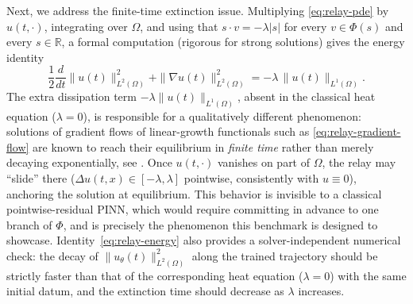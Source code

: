 \documentclass[11pt]{elsarticle}
\theoremstyle{definition}
\theoremstyle{remark}
\numberwithin{equation}{section}
\begin{document}
Next, we address the finite-time extinction issue. Multiplying \eqref{eq:relay-pde} by $u(t,\cdot)$, integrating over $\Omega$,
and using that $s\cdot v = -\lambda|s|$ for every $v\in\Phi(s)$ and every
$s\in\mathbb{R}$, a formal computation (rigorous for strong solutions) gives
the energy identity
\begin{equation}
	\label{eq:relay-energy}
	\frac12\frac{d}{dt}\|u(t)\|_{L^2(\Omega)}^2
	+
	\|\nabla u(t)\|_{L^2(\Omega)}^2
	=
	-\lambda\,\|u(t)\|_{L^1(\Omega)}.
\end{equation}
The extra dissipation term $-\lambda\|u(t)\|_{L^1(\Omega)}$, absent in the
classical heat equation ($\lambda=0$), is responsible for a qualitatively
different phenomenon: solutions of gradient flows of linear-growth
functionals such as \eqref{eq:relay-gradient-flow} are known to reach their
equilibrium in \emph{finite time} rather than merely decaying exponentially,
see \cite{AndreuCaselleMazon2004}. Once $u(t,\cdot)$ vanishes on part of
$\Omega$, the relay may ``slide'' there ($\Delta u(t,x)\in[-\lambda,\lambda]$
pointwise, consistently with $u\equiv0$), anchoring the solution at
equilibrium. This behavior is invisible to a classical pointwise-residual
PINN, which would require committing in advance to one branch of $\Phi$,
and is precisely the phenomenon this benchmark is designed to showcase.
Identity~\eqref{eq:relay-energy} also provides a solver-independent
numerical check: the decay of $\|u_\theta(t)\|_{L^2(\Omega)}^2$ along the
trained trajectory should be strictly faster than that of the corresponding
heat equation ($\lambda=0$) with the same initial datum, and the extinction
time should decrease as $\lambda$ increases.
\end{document}
